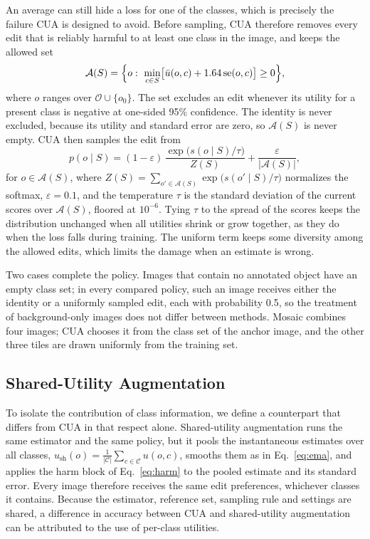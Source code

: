 An average can still hide a loss for one of the classes, which is precisely the failure CUA is designed to avoid. Before sampling, CUA therefore removes every edit that is reliably harmful to at least one class in the image, and keeps the allowed set
\begin{equation}
\mathcal{A}(S)=\Bigl\{o:\ \min_{c\in S}\bigl[\bar u(o,c)+1.64\,\mathrm{se}(o,c)\bigr]\geq 0\Bigr\},
\label{eq:harm}
\end{equation}
where $o$ ranges over $\mathcal{O}\cup\{o_0\}$. The set excludes an edit whenever its utility for a present class is negative at one-sided 95\% confidence. The identity is never excluded, because its utility and standard error are zero, so $\mathcal{A}(S)$ is never empty. CUA then samples the edit from
\begin{equation}
p(o\mid S)=(1-\varepsilon)\,\frac{\exp\bigl(s(o\mid S)/\tau\bigr)}{Z(S)}+\frac{\varepsilon}{|\mathcal{A}(S)|},
\label{eq:sampling}
\end{equation}
for $o\in\mathcal{A}(S)$, where $Z(S)=\sum_{o'\in\mathcal{A}(S)}\exp\bigl(s(o'\mid S)/\tau\bigr)$ normalizes the softmax, $\varepsilon=0.1$, and the temperature $\tau$ is the standard deviation of the current scores over $\mathcal{A}(S)$, floored at $10^{-6}$. Tying $\tau$ to the spread of the scores keeps the distribution unchanged when all utilities shrink or grow together, as they do when the loss falls during training. The uniform term keeps some diversity among the allowed edits, which limits the damage when an estimate is wrong.

Two cases complete the policy. Images that contain no annotated object have an empty class set; in every compared policy, such an image receives either the identity or a uniformly sampled edit, each with probability 0.5, so the treatment of background-only images does not differ between methods. Mosaic combines four images; CUA chooses it from the class set of the anchor image, and the other three tiles are drawn uniformly from the training set.

\subsection{Shared-Utility Augmentation}
\label{sec:method_shared}

To isolate the contribution of class information, we define a counterpart that differs from CUA in that respect alone. Shared-utility augmentation runs the same estimator and the same policy, but it pools the instantaneous estimates over all classes, $u_{\mathrm{sh}}(o)=\frac{1}{|\mathcal{C}|}\sum_{c\in\mathcal{C}}u(o,c)$, smooths them as in Eq.~\eqref{eq:ema}, and applies the harm block of Eq.~\eqref{eq:harm} to the pooled estimate and its standard error. Every image therefore receives the same edit preferences, whichever classes it contains. Because the estimator, reference set, sampling rule and settings are shared, a difference in accuracy between CUA and shared-utility augmentation can be attributed to the use of per-class utilities.


